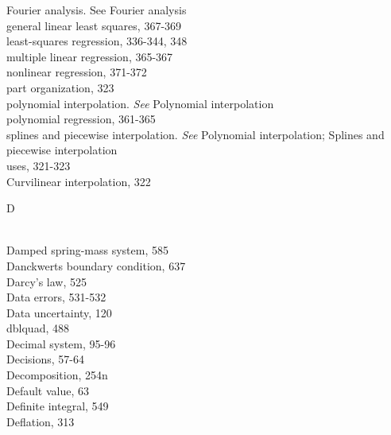 \documentclass[../main.tex]{subfiles}
\begin{document}
\begin{multicols}{3}
    \hspace*{3mm}Fourier analysis. See Fourier analysis\\
    \hspace*{3mm}general linear least squares, 367-369\\
    \hspace*{3mm}least-squares regression, 336-344, 348\\
    \hspace*{3mm}multiple linear regression, 365-367\\
    \hspace*{3mm}nonlinear regression, 371-372\\
    \hspace*{3mm}part organization, 323\\
    \hspace*{3mm}polynomial interpolation. \textit{See} Polynomial interpolation\\
    \hspace*{3mm}polynomial regression, 361-365\\
    \hspace*{3mm}splines and piecewise interpolation. \textit{See} Polynomial interpolation; Splines and\\
    \hspace*{3mm}piecewise interpolation\\
    \hspace*{3mm}uses, 321-323\\
    \hspace*{3mm}Curvilinear interpolation, 322\vspace*{2mm}\\
    \begin{huge} D \end{huge}\\
    Damped spring-mass system, 585\\
    Danckwerts boundary condition, 637\\
    Darcy's law, 525\\
    Data errors, 531-532\\
    Data uncertainty, 120\\
    dblquad, 488\\
    Decimal system, 95-96\\
    Decisions, 57-64\\
    Decomposition, 254n\\
    Default value, 63\\
    Definite integral, 549\\
    Deflation, 313\\

\end{multicols}
\end{document}
